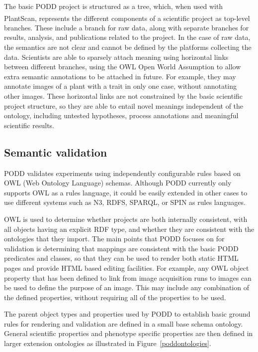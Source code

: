 \documentclass{llncs}
\begin{document}
The basic PODD project is structured as a tree, which, when used with
PlantScan\textsuperscript{\texttrademark}, represents the different components
of a scientific project as
top-level branches. These include a branch for raw data, along with separate
branches for results, analysis, and publications related to the project. In the
case of raw data, the semantics are not clear and cannot be defined by the
platforms collecting the data. Scientists are able to sparsely attach meaning
using horizontal links between different branches, using the OWL Open World
Assumption to allow extra semantic annotations to be attached in future. For
example, they may annotate images of a plant with a trait in only one case,
without annotating other images. These horizontal links are not constrained by
the basic scientific project structure, so they are able to entail novel
meanings independent of the ontology, including untested hypotheses, process
annotations and meaningful scientific results.


\subsection{Semantic validation}
PODD validates experiments using independently configurable rules based on OWL
(Web Ontology Language) schemas. Although PODD currently only supports OWL as a
rules language, it could be easily extended in other cases to use different
systems such as N3, RDFS, SPARQL, or SPIN as rules languages. 


OWL is used to determine whether projects are both internally consistent, with
all objects having an explicit RDF type, and whether they are consistent with
the ontologies that they import. The main points that PODD focuses on for
validation is determining that mappings are consistent with the basic PODD
predicates and classes, so that they can be used to render both static HTML
pages and provide HTML based editing facilities. For example, any OWL object
property that has been defined to link from image acquisition runs to images can
be used to define the purpose of an image. This may include any combination of
the defined properties, without requiring all of the properties to be used.


The parent object types and properties used by PODD to establish basic ground
rules for rendering and validation are defined in a small base schema ontology.
General scientific properties and phenotype specific properties are then defined
in larger extension ontologies as illustrated in Figure~\ref{poddontologies}.
\end{document}
